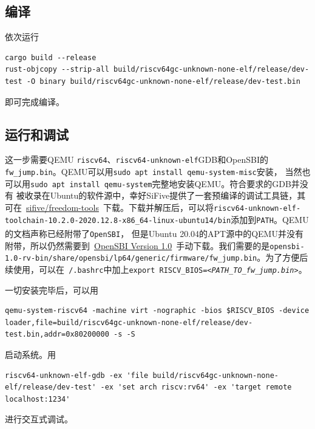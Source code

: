 \documentclass[UTF8,fontset=none,linespread=1.15]{ctexart}
\let\nosupcite\cite
\renewcommand*{\cite}[1]{\textsuperscript{\nosupcite{#1}}}
\begin{document}
\subsection{编译}
依次运行
\begin{lstlisting}
cargo build --release
rust-objcopy --strip-all build/riscv64gc-unknown-none-elf/release/dev-test -O binary build/riscv64gc-unknown-none-elf/release/dev-test.bin
\end{lstlisting}
即可完成编译。

\subsection{运行和调试}
这一步需要QEMU \texttt{riscv64}、\texttt{riscv64-unknown-elf}GDB和OpenSBI的
\texttt{fw\_jump.bin}。QEMU可以用\texttt{sudo apt install qemu-system-misc}安装，
当然也可以用\texttt{sudo apt install qemu-system}完整地安装QEMU。符合要求的GDB并没有
被收录在Ubuntu的软件源中，幸好SiFive提供了一套预编译的调试工具链，其可在\
\href{https://github.com/sifive/freedom-tools/releases}{sifive/freedom-tools}\
下载。下载并解压后，可以将\texttt{riscv64-unknown-elf-toolchain-10.2.0-2020.12.8-x86\_64-linux-ubuntu14/bin}添加到\texttt{PATH}。QEMU的文档声称已经附带了\texttt{OpenSBI}\cite{qemu-virt}，
但是Ubuntu 20.04的APT源中的QEMU并没有附带，所以仍然需要到\ \href{https://github.com/riscv-software-src/opensbi/releases/tag/v1.0}{OpenSBI Version 1.0}\
手动下载。我们需要的是\linebreak\texttt{opensbi-1.0-rv-bin/share/opensbi/lp64/generic/firmware/fw\_jump.bin}。为了方便后续使用，可以在\texttt{~/.bashrc}中加上\texttt{export RISCV\_BIOS=\textit{<PATH\_TO\_fw\_jump.bin>}}。

一切安装完毕后，可以用
\begin{lstlisting}
qemu-system-riscv64 -machine virt -nographic -bios $RISCV_BIOS -device loader,file=build/riscv64gc-unknown-none-elf/release/dev-test.bin,addr=0x80200000 -s -S
\end{lstlisting}
启动系统。用
\begin{lstlisting}
riscv64-unknown-elf-gdb -ex 'file build/riscv64gc-unknown-none-elf/release/dev-test' -ex 'set arch riscv:rv64' -ex 'target remote localhost:1234'
\end{lstlisting}
进行交互式调试。
\end{document}
